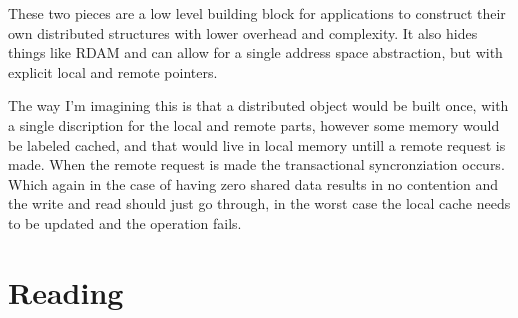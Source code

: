 These two pieces are a low level building block for applications to construct
their own distributed structures with lower overhead and complexity. It also
hides things like RDAM and can allow for a single address space abstraction,
but with explicit local and remote pointers.

The way I'm imagining this is that a distributed object would be built once,
with a single discription for the local and remote parts, however some memory
would be labeled cached, and that would live in local memory untill a remote
request is made. When the remote request is made the transactional
syncronziation occurs. Which again in the case of having zero shared data
results in no contention and the write and read should just go through, in
the worst case the local cache needs to be updated and the operation fails.





\section{Reading}
\label{sec:reading}

